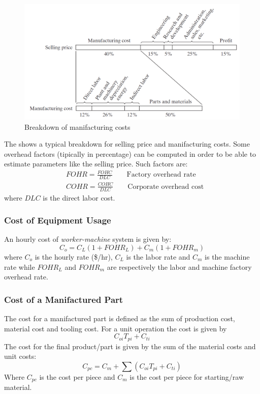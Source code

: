 \begin{figure}
    \centering
    \includegraphics[scale=0.6]{img/costs_manufacturing.png}
    \caption{Breakdown of manifacturing costs}
    \label{fig:J_Black}
\end{figure}

The  shows a typical breakdown for selling price and manifacturing costs. Some overhead factors (tipically in percentage) can be computed in order to be able to estimate parameters like the selling price. Such factors are:
\begin{align}
    &FOHR=\frac{FOHC}{DLC}\qquad\text{Factory overhead rate}\\
    &COHR=\frac{COHC}{DLC}\qquad\text{Corporate overhead cost}
\end{align}
where $DLC$ is the direct labor cost.

\subsubsection{Cost of Equipment Usage}
An hourly cost of \textit{worker-machine} system is given by: 
\begin{equation}
    C_o=C_L(1+FOHR_L)+C_m(1+FOHR_m)
\end{equation}
where $C_o$ is the hourly rate (\$/hr), $C_L$ is the labor rate and $C_m$ is the machine rate while $FOHR_L$ and $FOHR_m$ are respectively the labor and machine factory overhead rate. 

\subsubsection{Cost of a Manifactured Part}
The cost for a manifactured part is defined as the sum of production cost, material cost and tooling cost. For a unit operation the cost is given by 
\begin{equation}
    C_{oi}T_{pi}+C_{ti}
\end{equation}
The cost for the final product/part is given by the sum of the material costs and unit costs:
\begin{equation}
    C_{pc}=C_m+\sum (C_{oi}T_{pi}+C_{ti})
\end{equation}
Where $C_{pc}$ is the cost per piece and $C_m$ is the cost per piece for starting/raw material.